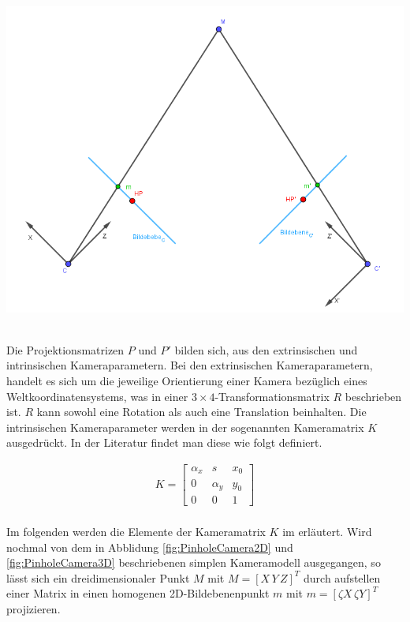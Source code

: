 	\begin{minipage}{\linewidth}
	\centering
	\includegraphics[width=.8\linewidth]{images/StereokopischerAufbauLochKamerModell.png}
	\label{fig:StereoaufbauLochkamermodell}
\end{minipage}\\

Die Projektionsmatrizen $P$ und $P'$ bilden sich, aus den extrinsischen und intrinsischen Kameraparametern. Bei den extrinsischen Kameraparametern, handelt es sich um die jeweilige Orientierung einer Kamera bezüglich eines Weltkoordinatensystems, was in einer $3\times 4$-Transformationsmatrix $R$ beschrieben ist. $R$ kann sowohl eine Rotation als auch eine Translation beinhalten. Die intrinsischen Kameraparameter werden in der sogenannten Kameramatrix $K$ ausgedrückt. In der Literatur findet man diese wie folgt definiert\cite{HZ}.

\begin{gather}
K=\begin{bmatrix}
\alpha_x&s&x_{0}\\
0&\alpha_y&y_{0}\\
0&0&1
\end{bmatrix}
\end{gather}\\

Im folgenden werden die Elemente der Kameramatrix $K$ im erläutert. Wird nochmal von dem in Abblidung \ref{fig:PinholeCamera2D} und \ref{fig:PinholeCamera3D} beschriebenen simplen Kameramodell ausgegangen, so lässt sich ein dreidimensionaler Punkt $M$ mit $M = [X\, Y\, Z]^T$ durch aufstellen einer Matrix in einen homogenen 2D-Bildebenenpunkt $m$ mit $m = [\zeta X\, \zeta Y]^T$ projizieren.

